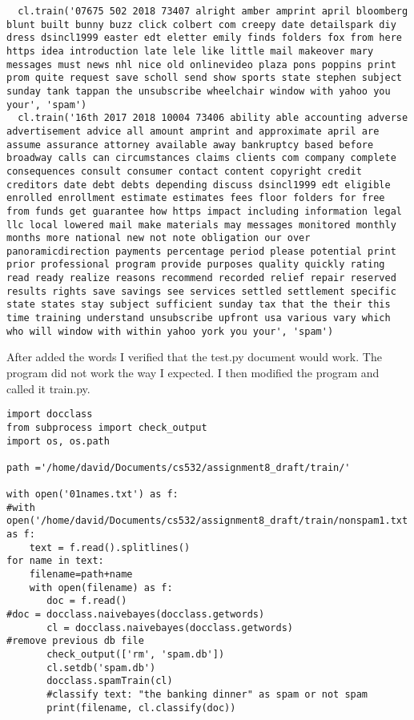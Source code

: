 \documentclass[10pt,letterpaper]{article}
\begin{document}
\begin{lstlisting}
  cl.train('07675 502 2018 73407 alright amber amprint april bloomberg blunt built bunny buzz click colbert com creepy date detailspark diy dress dsincl1999 easter edt eletter emily finds folders fox from here https idea introduction late lele like little mail makeover mary messages must news nhl nice old onlinevideo plaza pons poppins print prom quite request save scholl send show sports state stephen subject sunday tank tappan the unsubscribe wheelchair window with yahoo you your', 'spam')
  cl.train('16th 2017 2018 10004 73406 ability able accounting adverse advertisement advice all amount amprint and approximate april are assume assurance attorney available away bankruptcy based before broadway calls can circumstances claims clients com company complete consequences consult consumer contact content copyright credit creditors date debt debts depending discuss dsincl1999 edt eligible enrolled enrollment estimate estimates fees floor folders for free from funds get guarantee how https impact including information legal llc local lowered mail make materials may messages monitored monthly months more national new not note obligation our over panoramicdirection payments percentage period please potential print prior professional program provide purposes quality quickly rating read ready realize reasons recommend recorded relief repair reserved results rights save savings see services settled settlement specific state states stay subject sufficient sunday tax that the their this time training understand unsubscribe upfront usa various vary which who will window with within yahoo york you your', 'spam')
\end{lstlisting}

After added the words I verified that the test.py document would work.  The program did not work the way I expected.  I then modified the program and called it train.py.\\

\begin{lstlisting}
import docclass
from subprocess import check_output
import os, os.path

path ='/home/david/Documents/cs532/assignment8_draft/train/'

with open('01names.txt') as f:
#with open('/home/david/Documents/cs532/assignment8_draft/train/nonspam1.txt') as f:
    text = f.read().splitlines()
for name in text:
    filename=path+name             
    with open(filename) as f:
       doc = f.read()
#doc = docclass.naivebayes(docclass.getwords)
       cl = docclass.naivebayes(docclass.getwords)
#remove previous db file
       check_output(['rm', 'spam.db'])
       cl.setdb('spam.db')
       docclass.spamTrain(cl)
       #classify text: "the banking dinner" as spam or not spam
       print(filename, cl.classify(doc))
\end{lstlisting}
\end{document}
